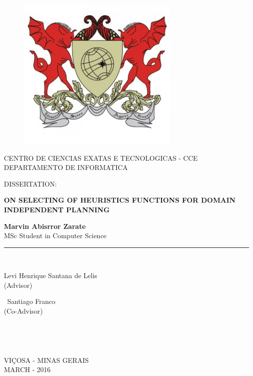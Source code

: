 \documentclass[a4paper,12pt]{article}
\begin{document}
\doublespacing

\begin{titlepage}

\begin{center}
\vspace*{-1in}
\begin{figure}[htb]
\begin{center}
\includegraphics[width=8cm]{./image/ufv1}
\end{center}
\end{figure}

CENTRO DE CIENCIAS EXATAS E TECNOLOGICAS - CCE\\
\vspace*{0.15in}
DEPARTAMENTO DE INFORMATICA \\
\vspace*{0.6in}
\begin{large}
DISSERTATION:\\
\end{large}
\vspace*{0.2in}
\begin{Large}
\textbf{ON SELECTING OF HEURISTICS FUNCTIONS FOR DOMAIN INDEPENDENT PLANNING} \\
\end{Large}
\vspace*{0.3in}
\begin{large}
\textbf{Marvin Abisrror Zarate} \\
MSc Student in Computer Science \\
\end{large}
\vspace*{0.1in}
\rule{80mm}{0.1mm}\\
\vspace*{0.1in}
\begin{large}
Levi Henrique Santana de Lelis \\
(Advisor)
\

\
Santiago Franco \\
(Co-Advisor)
\

\

\
\end{large}
VIÇOSA - MINAS GERAIS\\
MARCH - 2016
\end{center}
\end{titlepage}
\end{document}

